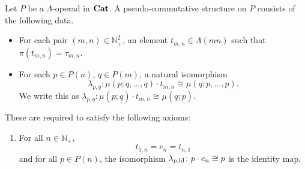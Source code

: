 \begin{Defi}\label{def:ps-comm_operad}
Let $P$ be a $\Lambda$-operad in $\mathbf{Cat}$. A pseudo-commutative structure on $P$ consists of the following data.
    \begin{itemize}
        \item For each pair $(m,n) \in \mathbb{N}_{+}^2$, an element $t_{m,n} \in \Lambda(mn)$ such that $\pi(t_{m,n}) = \tau_{m,n}$.
        \item For each $p \in P(n)$, $q \in P(m)$, a natural isomorphism
            \[
                \lambda_{p,q} \colon \mu(p;q,\ldots,q) \cdot t_{m,n} \cong \mu(q;p,\ldots,p).
            \]
            We write this as $\lambda_{p,q}\colon \mu(p; \underline{q}) \cdot t_{m,n} \cong \mu(q; \underline{p})$.
    \end{itemize}
These are required to satisfy the following axioms:  
    \begin{enumerate}
        \item\label{axiom:t_id} For all $n \in \mathbb{N}_+$,
            \[
                t_{1,n} = e_n = t_{n,1}
            \]
             and for all $p \in P(n)$, the isomorphism $\lambda_{p, \textrm{id}}\colon p \cdot e_n \cong p$ is the identity map.

\end{enumerate}
\end{Defi}
